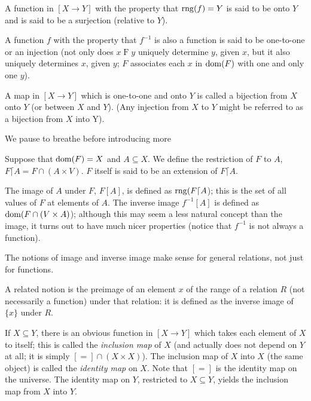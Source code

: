 \begin{definitions}
 A function in $[X \rightarrow  Y]$
 with the property that $\mathop{\mathrm{rng}}(f) = Y$ is said
 to be {\upshape onto} $Y$ and is said 
 to be a {\upshape surjection} (relative to $Y$).  

 A function $f$ with the property
 that $f^{-1}$ is also a function is said to be {\upshape
 one-to-one} or an
 {\upshape injection} (not only does $x
 \mathrel{F} y$ uniquely determine $y$, given $x$, but it
 also uniquely determines $x$, given $y$; $F$ associates each $x$ in $\mathop{\mathrm{dom}}(F)$
 with one and only one $y$).  

 A map in $[X \rightarrow  Y]$ which is one-to-one and
 onto $Y$ is called a {\upshape
 bijection} from $X$ onto $Y$ (or {\upshape between}
 $X$ and $Y$). 
 (Any injection from $X$ to $Y$ might be referred to as a bijection from $X$
 {\upshape into\/} Y).
\end{definitions}

We pause to breathe before introducing more
\begin{definitions}        
 Suppose that $\mathop{\mathrm{dom}}(F) = X$ and $A \subseteq X$.
 We define the {\upshape restriction} of $F$ to $A$, $F\lceil A = F \cap
 (A \times V)$. $F$ itself is said to be an {\upshape extension\/} of
 $F\lceil A$.

 The {\upshape image} of $A$ under $F$, $F[A]$, is defined
 as $\mathop{\mathrm{rng}}(F\lceil A$); this is the set of all values of $F$ at elements of $A$. 
 The {\upshape inverse image} $f^{-1}[A]$ is
 defined as $\mathop{\mathrm{dom}}(F \cap (V \times A)$); although this may seem a less natural
 concept than the image, it turns out to have much nicer properties (notice
 that $f^{-1}$ is not always a function).

 The notions of image and inverse image make sense for general
 relations, not just for functions.

 A related notion is the {\upshape preimage} of an
 element $x$ of the range of a relation $R$ (not necessarily a function) under
 that relation: it is defined as the inverse image of $\{x\}$ under $R$.
\end{definitions}

If $X \subseteq Y$, there is an obvious function in $[X
\rightarrow Y]$ which takes each element of $X$ to itself; this is
called the {\itshape inclusion map\/} of $X$ (and actually
does not depend on $Y$ at all; it is simply $[=] \cap (X \times X)$).  The
inclusion map of $X$ into $X$ (the same object) is called the {\itshape
identity map\/} on $X$.  Note that $[=]$ is the
identity map on the universe.
The identity map on $Y$, restricted to $X \subseteq Y$, yields the
inclusion map from $X$ into $Y$.

